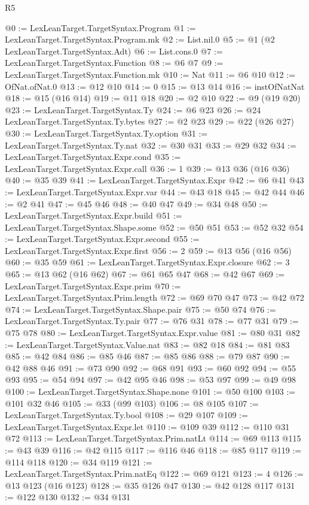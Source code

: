 \begin{lexlean}{R5}
\begin{coremodule}
@0 := LexLeanTarget.TargetSyntax.Program
@1 := LexLeanTarget.TargetSyntax.Program.mk
@2 := List.nil.{0}
@5 := @1 (@2 LexLeanTarget.TargetSyntax.Adt)
@6 := List.cons.{0}
@7 := LexLeanTarget.TargetSyntax.Function
@8 := @6 @7
@9 := LexLeanTarget.TargetSyntax.Function.mk
@10 := Nat
@11 := @6 @10
@12 := OfNat.ofNat.{0}
@13 := @12 @10
@14 := 0
@15 := @13 @14
@16 := instOfNatNat
@18 := @15 (@16 @14)
@19 := @11 @18
@20 := @2 @10
@22 := @9 (@19 @20)
@23 := LexLeanTarget.TargetSyntax.Ty
@24 := @6 @23
@26 := @24 LexLeanTarget.TargetSyntax.Ty.bytes
@27 := @2 @23
@29 := @22 (@26 @27)
@30 := LexLeanTarget.TargetSyntax.Ty.option
@31 := LexLeanTarget.TargetSyntax.Ty.nat
@32 := @30 @31
@33 := @29 @32
@34 := LexLeanTarget.TargetSyntax.Expr.cond
@35 := LexLeanTarget.TargetSyntax.Expr.call
@36 := 1
@39 := @13 @36 (@16 @36)
@40 := @35 @39
@41 := LexLeanTarget.TargetSyntax.Expr
@42 := @6 @41
@43 := LexLeanTarget.TargetSyntax.Expr.var
@44 := @43 @18
@45 := @42 @44
@46 := @2 @41
@47 := @45 @46
@48 := @40 @47
@49 := @34 @48
@50 := LexLeanTarget.TargetSyntax.Expr.build
@51 := LexLeanTarget.TargetSyntax.Shape.some
@52 := @50 @51
@53 := @52 @32
@54 := LexLeanTarget.TargetSyntax.Expr.second
@55 := LexLeanTarget.TargetSyntax.Expr.first
@56 := 2
@59 := @13 @56 (@16 @56)
@60 := @35 @59
@61 := LexLeanTarget.TargetSyntax.Expr.closure
@62 := 3
@65 := @13 @62 (@16 @62)
@67 := @61 @65 @47
@68 := @42 @67
@69 := LexLeanTarget.TargetSyntax.Expr.prim
@70 := LexLeanTarget.TargetSyntax.Prim.length
@72 := @69 @70 @47
@73 := @42 @72
@74 := LexLeanTarget.TargetSyntax.Shape.pair
@75 := @50 @74
@76 := LexLeanTarget.TargetSyntax.Ty.pair
@77 := @76 @31
@78 := @77 @31
@79 := @75 @78
@80 := LexLeanTarget.TargetSyntax.Expr.value
@81 := @80 @31
@82 := LexLeanTarget.TargetSyntax.Value.nat
@83 := @82 @18
@84 := @81 @83
@85 := @42 @84
@86 := @85 @46
@87 := @85 @86
@88 := @79 @87
@90 := @42 @88 @46
@91 := @73 @90
@92 := @68 @91
@93 := @60 @92
@94 := @55 @93
@95 := @54 @94
@97 := @42 @95 @46
@98 := @53 @97
@99 := @49 @98
@100 := LexLeanTarget.TargetSyntax.Shape.none
@101 := @50 @100
@103 := @101 @32 @46
@105 := @33 (@99 @103)
@106 := @8 @105
@107 := LexLeanTarget.TargetSyntax.Ty.bool
@108 := @29 @107
@109 := LexLeanTarget.TargetSyntax.Expr.let
@110 := @109 @39
@112 := @110 @31 @72
@113 := LexLeanTarget.TargetSyntax.Prim.natLt
@114 := @69 @113
@115 := @43 @39
@116 := @42 @115
@117 := @116 @46
@118 := @85 @117
@119 := @114 @118
@120 := @34 @119
@121 := LexLeanTarget.TargetSyntax.Prim.natEq
@122 := @69 @121
@123 := 4
@126 := @13 @123 (@16 @123)
@128 := @35 @126 @47
@130 := @42 @128 @117
@131 := @122 @130
@132 := @34 @131

\end{coremodule}
\end{lexlean}
